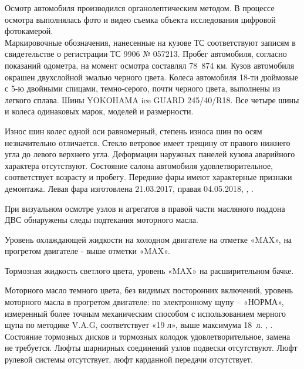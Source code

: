 Осмотр автомобиля производился  органолептическим методом. В процессе осмотра выполнялась фото и видео съемка объекта исследования цифровой фотокамерой.\\ 
Маркировочные обозначения, нанесенные на кузове ТС соответствуют записям  в свидетельстве о регистрации ТС  9906 № 057213. Пробег автомобиля, согласно показаний одометра, на момент осмотра составлял 78~874 км.   Кузов автомобиля окрашен двухслойной эмалью черного цвета. Колеса автомобиля 18-ти дюймовые с 5-ю двойными спицами, темно-серого, почти черного цвета,  выполнены из легкого сплава. Шины YOKOHAMA ice GUARD 245/40/R18. Все четыре шины и колеса одинаковых марок, моделей и размерности.


 Износ шин колес одной оси равномерный, степень износа шин по осям незначительно отличается.   Стекло ветровое имеет трещину от правого нижнего угла до левого верхнего угла. Деформации  наружных панелей кузова аварийного характера отсутствуют. Состояние салона автомобиля удовлетворительное, соответствует возрасту и пробегу.  Передние фары имеют характерные признаки демонтажа.  Левая фара изготовлена 21.03.2017, правая 04.05.2018, , .
 
 
 При визуальном осмотре узлов и агрегатов в правой части масляного поддона ДВС обнаружены следы подтекания  моторного масла.
   
 Уровень охлаждающей жидкости на холодном двигателе на отметке «MAX», на прогретом двигателе - выше отметки «MAX». 
 
 Тормозная жидкость  светлого цвета, уровень «MAX» на расширительном бачке.
 
 Моторного масло темного цвета, без видимых посторонних включений, уровень моторного масла в прогретом двигателе: по электронному щупу – «НОРМА»,   измеренный более точным механическим способом с использованием мерного щупа по методике V.A.G,  соответствует «19 л»,  выше максимума 18~л. , . Состояние тормозных дисков и тормозных колодок удовлетворительное,  замена не требуется. Люфты шарнирных соединений узлов подвески отсутствуют. Люфт рулевой системы отсутствует,  люфт карданной передачи отсутствует. 
 
